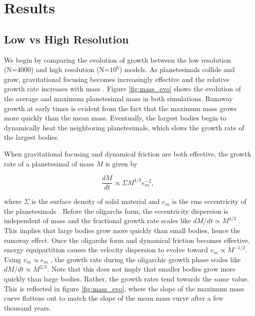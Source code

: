 \section{Results} \label{sec:plSS_results}

\subsection{Low vs High Resolution}\label{sec:lowvshigh}

We begin by comparing the evolution of growth between the low resolution (N=4000) and high resolution (N=$10^{6}$) models. 
As planetesimals collide and grow, gravitational focusing becomes increasingly effective and the relative growth rate increases 
with mass \cite{greenberg78}. Figure \ref{fig:mass_evo} shows the evolution of the average and maximum planetesimal 
mass in both simulations. Runaway growth at early times is evident from the fact that the maximum mass grows more quickly 
than the mean mass. Eventually, the largest bodies begin to dynamically heat the neighboring planetesimals, which slows the 
growth rate of the largest bodies.

When gravitational focusing and dynamical friction are both effective, the growth rate of a planetesimal of mass $M$ is given by

\begin{equation}\label{eq:growth_rate}
\frac{dM}{dt} \propto \Sigma M^{4/3} e_{m}^{-2},
\end{equation}

\noindent where $\Sigma$ is the surface density of solid material and $e_m$ is the rms eccentricity of the planetesimals 
\cite{kokubo95}. Before the oligarchs form, the eccentricity dispersion is independent of mass and the fractional growth rate 
scales like $dM/dt \propto M^{4/3}$ \cite{wetherill93}. This implies that large bodies grow more quickly than small bodies, hence 
the runaway effect. Once the oligarchs form and dynamical friction becomes effective, energy equipartition causes the velocity 
dispersion to evolve toward $v_m \propto M^{-1/2}$\cite{ida93a}. Using $v_m \propto e_m$ \cite{lissauer93}, the growth rate 
during the oligarchic growth phase scales like  $dM/dt \propto M^{2/3}$. Note that this does not imply that smaller bodies grow 
more quickly than large bodies. Rather, the growth rates tend towards the same value. This is reflected in figure 
\ref{fig:mass_evo}, where the slope of the maximum mass curve flattens out to match the slope of the mean mass curve after a 
few thousand years.


